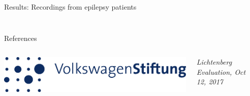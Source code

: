 \documentclass{beamer}
\renewcommand{\emph}{\textbf}
\begin{document}
\begin{frame}[t]
\begin{columns}[T]
\begin{column}{.49\linewidth}
\begin{block}{Results: Recordings from epilepsy patients}
\begin{columns}[T]
\begin{column}{.95\linewidth}
\begin{columns}[T]
\begin{column}{.48\linewidth}
\begin{figure}[T]
\end{figure}
\end{column}
\end{columns}

\end{column}
\end{columns}
\end{block}
\begin{block}{References}
\begin{columns}[T]
  \begin{column}{.97\linewidth}
\appto\bibfont{\small}
\printbibliography
\end{column}
\end{columns}
\vspace{.9em}
\end{block}

\end{column} %
\end{columns}

\begin{columns}[c]%
  \begin{column}{.3\linewidth} 
    \includegraphics[width=\linewidth]{../figures/logo-vwstiftung.png}
  \end{column}
  \begin{column}{.3\linewidth}
    \begin{centering}
      \textit{
     \hfill Lichtenberg Evaluation, Oct 12, 2017 \hfill}
    \end{centering}
  \end{column}
  \begin{column}{.3\linewidth}
  \end{column}
\end{columns}
\end{frame}
\end{document}
